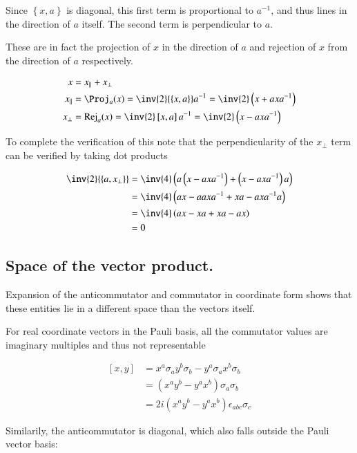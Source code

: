 \documentclass{article}
\newcommand{\symmetric}[2]{{\left\{{#1},{#2}\right\}}}
\newcommand{\antisymmetric}[2]{\left[{#1},{#2}\right]}
\begin{document}
Since $\symmetric{x}{a}$ is diagonal, this first term is proportional to $a^{-1}$, and thus lines in the direction of $a$ itself.
The second term is perpendicular to $a$.

These are in fact the projection of $x$ in the direction of $a$ and rejection of $x$ from the direction of $a$ respectively.

\begin{align*}
x &= x_\parallel + x_\perp \\
x_\parallel &= \Proj_a(x) = \inv{2}\symmetric{x}{a}a^{-1} = \inv{2}\left(x + a x a^{-1} \right) \\
x_\perp &= \RejName_a(x) = \inv{2} \antisymmetric{x}{a} a^{-1} = \inv{2} \left( x - a x a^{-1} \right) \\
\end{align*}

To complete the verification of this note that the perpendicularity of the $x_\perp$ term can be verified by taking dot products

\begin{align*}
\inv{2}\symmetric{a}{x_\perp} 
&= \inv{4}\left( a \left(x - a x a^{-1} \right) +\left(x - a x a^{-1} \right) a \right) \\
&= \inv{4}\left( a x - a a x a^{-1} + x a - a x a^{-1} a \right) \\
&= \inv{4}\left( a x - x a + x a - a x \right) \\
&= 0
\end{align*}

\subsection{ Space of the vector product. }

Expansion of the anticommutator and commutator in coordinate form shows that these entities lie in a different space than the vectors itself.

For real coordinate vectors in the Pauli basis, all the commutator values are imaginary multiples and thus not representable

\begin{align*}
\antisymmetric{x}{y} 
&= x^a \sigma_a y^b \sigma_b - y^a \sigma_a x^b \sigma_b \\
&= (x^a y^b - y^a x^b) \sigma_a \sigma_b \\
&= 2 i (x^a y^b - y^a x^b) \epsilon_{a b c} \sigma_c
\end{align*}

Similarily, the anticommutator is diagonal, which also falls outside the Pauli vector basis:
\end{document}
